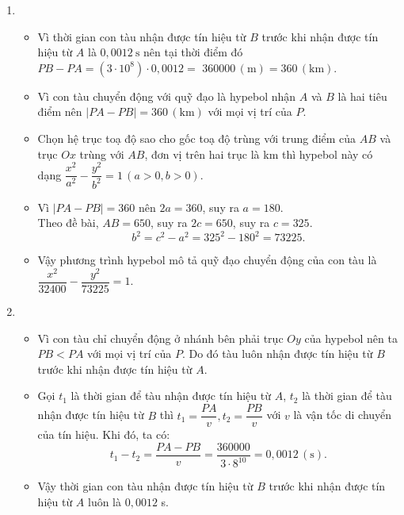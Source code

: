 \begin{vd}
{    \begin{enumerate}
    \item 
    \begin{itemize}
        \item   Vì thời gian con tàu nhận được tín hiệu từ  $B$ trước khi nhận được tín hiệu từ $A$ là $0{,}0012 \mathrm{~s}$ nên tại thời điểm đó $PB-PA=\left(3 \cdot 10^8\right) \cdot 0{,}0012=$ $360000 \, (\mathrm{m})=360 \,(\mathrm{km})$.
        \item   Vì con tàu chuyển động với quỹ đạo là hypebol nhận $A$ và $B$ là hai tiêu điểm nên $\mid P A - PB \mid=360 \,(\mathrm{km})$ với mọi vị trí của $P$.
        \item  Chọn hệ trục toạ độ sao cho gốc toạ độ trùng với trung điểm của $A B$ và trục $Ox$ trùng với $A B$, đơn vị trên hai trục là km thì hypebol này có dạng $\dfrac{x^2}{a^2}-\dfrac{y^2}{b^2}=1 \,(a>0,  b>0)$.
        \item Vì $|PA-PB|=360$ nên $2a=360$, suy ra $a=180$.\\
        Theo đề bài, $AB=650$, suy ra $2c=650$, suy ra $c=325$.
        $$
        b^2=c^2-a^2=325^2-180^2=73225.  $$
        \item   Vậy phương trình hypebol mô tả quỹ đạo chuyển động của con tàu là $\dfrac{x^2}{32400}-\dfrac{y^2}{73225}=1.$    
    \end{itemize}

    \item 
    \begin{itemize}
        \item Vì con tàu chỉ chuyển động ở nhánh bên phải trục $Oy$ của hypebol nên ta $PB < PA$ với mọi vị trí của $P$. Do đó tàu luôn nhận được tín hiệu từ $B$ trước khi nhận được tín hiệu từ $A$.
        \item Gọi $t_1$ là thời gian để tàu nhận được tín hiệu từ $A$, $t_2$ là thời gian để tàu nhận được tín hiệu từ $B$ thì $t_1=\dfrac{PA}{v}, t_2=\dfrac{PB}{v}$ với $v$ là vận tốc di chuyển của tín hiệu. Khi đó, ta có:
        $$
        t_1-t_2=\dfrac{PA-PB}{v}=\dfrac{360000}{3 \cdot 8^{10}}=0{,}0012\,(\mathrm{s}).
        $$
        \item   Vậy thời gian con tàu nhận được tín hiệu từ $B$ trước khi nhận được tín hiệu từ $A$ luôn là $0{,}0012$ s.
    
    \end{itemize}
    
    \end{enumerate} 
    

    }
\end{vd}











    
